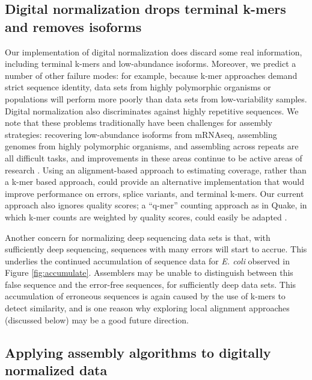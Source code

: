 \subsection{Digital normalization drops terminal k-mers and removes isoforms}

Our implementation of digital normalization does discard some real
information, including terminal k-mers and low-abundance isoforms.
Moreover, we predict a number of other failure modes: for example,
because k-mer approaches demand strict sequence identity, data sets
from highly polymorphic organisms or populations will perform more
poorly than data sets from low-variability samples.  Digital
normalization also discriminates against highly repetitive
sequences. We note that these problems traditionally have been
challenges for assembly strategies: recovering low-abundance isoforms
from mRNAseq, assembling genomes from highly polymorphic organisms,
and assembling across repeats are all difficult tasks, and
improvements in these areas continue to be active areas of research
\cite{pubmed18549302,pubmed20633259,pubmed18541131}.  Using an
alignment-based approach to estimating coverage, rather than a k-mer
based approach, could provide an alternative implementation that would
improve performance on errors, splice variants, and terminal k-mers.
Our current approach also ignores quality scores; a ``q-mer'' counting
approach as in Quake, in which k-mer counts are weighted by quality
scores, could easily be adapted \cite{pubmed21114842}.

Another concern for normalizing deep sequencing data sets is that,
with sufficiently deep sequencing, sequences with many errors will
start to accrue.  This underlies the continued accumulation of
sequence data for {\em E. coli} observed in Figure
\ref{fig:accumulate}.  Assemblers may be unable to distinguish between
this false sequence and the error-free sequences, for sufficiently
deep data sets.  This accumulation of erroneous sequences is again
caused by the use of k-mers to detect similarity, and is one reason
why exploring local alignment approaches (discussed below) may be a
good future direction.

\newpage

\subsection{Applying assembly algorithms to digitally normalized data}


